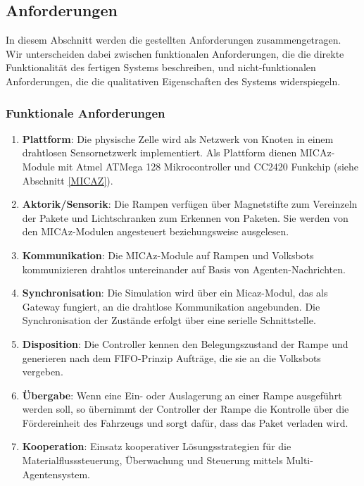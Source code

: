 \subsection{Anforderungen}
In diesem Abschnitt werden die gestellten Anforderungen zusammengetragen. Wir unterscheiden dabei zwischen funktionalen Anforderungen, die die direkte Funktionalität des fertigen Systems beschreiben, und nicht-funktionalen Anforderungen, die die qualitativen Eigenschaften des Systems widerspiegeln.
\subsubsection{Funktionale Anforderungen}
\begin{enumerate}
\item \textbf{Plattform}: Die physische Zelle wird als Netzwerk von Knoten in einem drahtlosen Sensornetzwerk implementiert. Als Plattform dienen MICAz-Module mit Atmel ATMega 128 Mikrocontroller und CC2420 Funkchip (siehe Abschnitt \ref{MICAZ}).
 \item \textbf{Aktorik/Sensorik}: Die Rampen verfügen über Magnetstifte zum Vereinzeln der Pakete und Lichtschranken zum Erkennen von Paketen. Sie werden von den MICAz-Modulen angesteuert beziehungsweise ausgelesen.
 \item \textbf{Kommunikation}: Die MICAz-Module auf Rampen und Volksbots kommunizieren drahtlos untereinander auf Basis von Agenten-Nachrichten.
 \item \textbf{Synchronisation}: Die Simulation wird über ein Micaz-Modul, das als Gateway fungiert, an die drahtlose Kommunikation angebunden. Die Synchronisation der Zustände erfolgt über eine serielle Schnittstelle.
 \item \textbf{Disposition}: Die Controller kennen den Belegungszustand der Rampe und generieren nach dem FIFO-Prinzip Aufträge, die sie an die Volksbots vergeben.
 \item \textbf{Übergabe}: Wenn eine Ein- oder Auslagerung an einer Rampe ausgeführt werden soll, so übernimmt der Controller der Rampe die Kontrolle über die Fördereinheit des Fahrzeugs und sorgt dafür, dass das Paket verladen wird.
 \item \textbf{Kooperation}: Einsatz kooperativer Lösungsstrategien für die Materialflusssteuerung, Überwachung und Steuerung mittels Multi-Agentensystem.
\end{enumerate}

